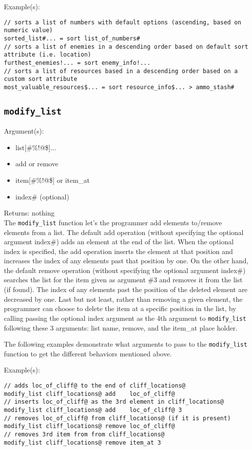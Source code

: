 \documentclass[a4paper]{article}
\begin{document}
Example(s):
\begin{verbatim}
// sorts a list of numbers with default options (ascending, based on numeric value)
sorted_list#... = sort list_of_numbers#
// sorts a list of enemies in a descending order based on default sort attribute (i.e. location)
furthest_enemies!... = sort enemy_info!...
// sorts a list of resources based in a descending order based on a custom sort attribute
most_valuable_resources$... = sort resource_info$... > ammo_stash#
\end{verbatim}

\subsection{\texttt{modify\_list}}

Argument(s):
\begin{itemize}
	\item list[\#\%!@\$]...
	\item add or remove
	\item item[\#\%!@\$] or item\_at
	\item index\# (optional)
\end{itemize}

\noindent Returns: nothing\\

The \texttt{modify\_list} function let's the programmer add elements to/remove elements from a list.  The default add operation (without specifying the optional argument index\#) adds an element at the end of the list.  When the optional index is specified, the add operation inserts the element at that position and increases the index of any elements past that position by one.  On the other hand, the default remove operation (without specifying the optional argument index\#) searches the list for the item given as argument \#3 and removes it from the list (if found).  The index of any elements past the position of the deleted element are decreased by one.  Last but not least, rather than removing a given element, the programmer can choose to delete the item at a specific position in the list, by calling passing the optional index argument as the 4th argument to \texttt{modify\_list} following these 3 arguments: list name, remove, and the item\_at place holder.

The following examples demonstrate what arguments to pass to the \texttt{modify\_list} function to get the different behaviors mentioned above.

Example(s):
\begin{verbatim}
// adds loc_of_cliff@ to the end of cliff_locations@
modify_list cliff_locations@ add    loc_of_cliff@
// inserts loc_of_cliff@ as the 3rd element in cliff_locations@
modify_list cliff_locations@ add    loc_of_cliff@ 3
// removes loc_of_cliff@ from cliff_locations@ (if it is present)
modify_list cliff_locations@ remove loc_of_cliff@
// removes 3rd item from from cliff_locations@
modify_list cliff_locations@ remove item_at 3
\end{verbatim}
\end{document}
